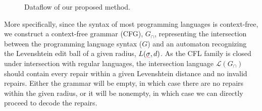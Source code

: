 \documentclass[sigplan,acmsmall,nonacm,screen]{acmart}\settopmatter{printfolios=false,printccs=false,printacmref=false}
\begin{document}
\begin{figure}
\begin{center}
{
      }
    \end{center}
    \caption{Dataflow of our proposed method.}\label{fig:flowchart}
    \vspace{-0.5cm}
  \end{figure}

  More specifically, since the syntax of most programming languages is context-free, we construct a context-free grammar (CFG), $G_\cap$, representing the intersection between the programming language syntax ($G$) and an automaton recognizing the Levenshtein edit ball of a given radius, $L(\err\sigma, d)$. As the CFL family is closed under intersection with regular languages, the intersection language $\mathcal{L}(G_\cap)$ should contain every repair within a given Levenshtein distance and no invalid repairs. Either the grammar will be empty, in which case there are no repairs within the given radius, or it will be nonempty, in which case we can directly proceed to decode the repairs.

\end{document}
